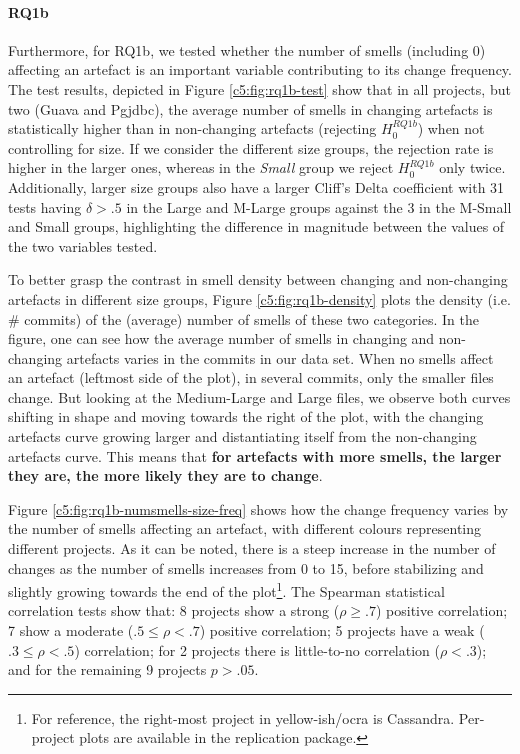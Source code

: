 \paragraph{RQ1b}
Furthermore, for RQ1b, we tested whether the number of smells (including 0) affecting an artefact is an important variable contributing to its change frequency.
The test results, depicted in Figure \ref{c5:fig:rq1b-test} show that in all projects, but two (Guava and Pgjdbc), the average number of smells in changing artefacts is statistically higher than in non-changing artefacts (rejecting $H^{RQ1b}_0$) when not controlling for size.
If we consider the different size groups, the rejection rate is higher in the larger ones, whereas in the \emph{Small} group we reject $H^{RQ1b}_0$ only twice. Additionally, larger size groups also have a larger Cliff's Delta coefficient with 31 tests having $\delta > .5$ in the Large and M-Large groups against the 3 in the M-Small and Small groups, highlighting the difference in magnitude between the values of the two variables tested.

To better grasp the contrast in smell density between changing and non-changing artefacts in different size groups, Figure \ref{c5:fig:rq1b-density} plots the density (i.e. \# commits) of the (average) number of smells of these two categories.
In the figure, one can see how the average number of smells in changing and non-changing artefacts varies in the commits in our data set. When no smells affect an artefact (leftmost side of the plot), in several commits, only the smaller files change. But looking at the Medium-Large and Large files, we observe both curves shifting in shape and moving towards the right of the plot, with the changing artefacts curve growing larger and distantiating itself from the non-changing artefacts curve.
This means that \textbf{for artefacts with more smells, the larger they are, the more likely they are to change}.

Figure \ref{c5:fig:rq1b-numsmells-size-freq} shows how the change frequency varies by the number of smells affecting an artefact, with different colours representing different projects. 
As it can be noted, there is a steep increase in the number of changes as the number of smells increases from 0 to 15, before stabilizing and slightly growing towards the end of the plot\footnote{For reference, the right-most project in yellow-ish/ocra is Cassandra. Per-project plots are available in the replication package.}. 
The Spearman statistical correlation tests show that: 8 projects show a strong ($\rho \ge .7$) positive correlation; 7 show a moderate ($.5 \le \rho < .7$) positive correlation; 5 projects have a weak ($.3 \le \rho < .5$) correlation; for 2 projects there is little-to-no correlation ($ \rho <.3 $); and for the remaining 9 projects $p > .05$.

